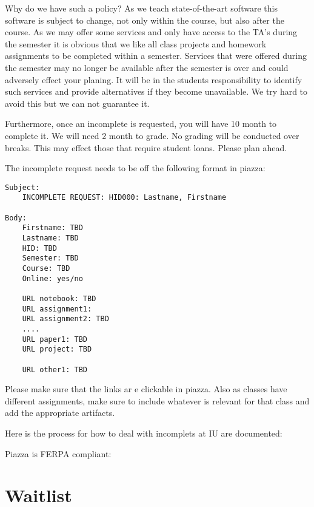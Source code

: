 Why do we have such a policy? As we teach state-of-the-art software this
software is subject to change, not only within the course, but also
after the course. As we may offer some services and only have access to
the TA's during the semester it is obvious that we like all class
projects and homework assignments to be completed within a semester.
Services that were offered during the semester may no longer be
available after the semester is over and could adversely effect your
planing. It will be in the students responsibility to identify such
services and provide alternatives if they become unavailable. We try
hard to avoid this but we can not guarantee it.

Furthermore, once an incomplete is requested, you will have 10 month to
complete it. We will need 2 month to grade. No grading will be conducted
over breaks. This may effect those that require student loans. Please
plan ahead.

The incomplete request needs to be off the following format in piazza:

\begin{verbatim}
Subject: 
    INCOMPLETE REQUEST: HID000: Lastname, Firstname

Body:
    Firstname: TBD
    Lastname: TBD
    HID: TBD
    Semester: TBD
    Course: TBD
    Online: yes/no

    URL notebook: TBD    
    URL assignment1:
    URL assignment2: TBD
    ....
    URL paper1: TBD
    URL project: TBD

    URL other1: TBD
\end{verbatim}

Please make sure that the links ar e clickable in piazza. Also as
classes have different assignments, make sure to include whatever is
relevant for that class and add the appropriate artifacts.

\begin{IU}
Here is the process for how to deal with incomplets at IU are documented:


Piazza is FERPA compliant:


\end{IU}


\section{Waitlist}\label{waitlist}

